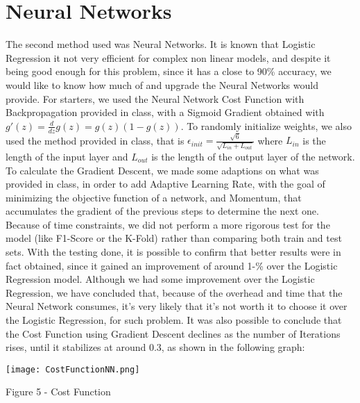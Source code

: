 \documentclass[conference]{IEEEtran}
\begin{document}
\section{Neural Networks}
The second method used was Neural Networks. It is known that Logistic Regression it not very efficient for complex non linear models, and despite it being good enough for this problem, since it has a close to 90\% accuracy, we would like to know how much of and upgrade the Neural Networks would provide. For starters, we used the Neural Network Cost Function with Backpropagation provided in class, with a Sigmoid Gradient obtained with \(g'(z) = \frac{d}{dz}g(z) = g(z)(1-g(z))\). To randomly initialize weights, we also used the method provided in class, that is \(\epsilon_{init} = \frac{\sqrt{6}}{\sqrt{L_{in} + L_{out}}}\) where \(L_{in}\) is the length of the input layer and \(L_{out}\) is the length of the output layer of the network. To calculate the Gradient Descent, we made some adaptions on what was provided in class, in order to add Adaptive Learning Rate, with the goal of minimizing the objective function of a network, and Momentum, that accumulates the gradient of the previous steps to determine the next one. Because of time constraints, we did not perform a more rigorous test for the model (like F1-Score or the K-Fold) rather than comparing both train and test sets. With the testing done, it is possible to confirm that better results were in fact obtained, since it gained an improvement of around 1-\% over the Logistic Regression model. Although we had some improvement over the Logistic Regression, we have concluded that, because of the overhead and time that the Neural Network consumes, it's very likely that it's not worth it to choose it over the Logistic Regression, for such problem. It was also possible to conclude that the Cost Function using Gradient Descent declines as the number of Iterations rises, until it stabilizes at around 0.3, as shown in the following graph: 
\par
\texttt{[image: CostFunctionNN.png]}
\caption{Figure 5 - Cost Function}
\par
\end{document}
